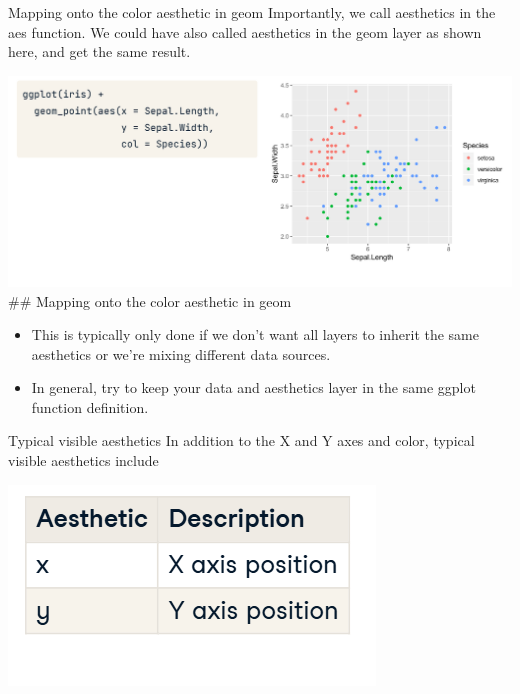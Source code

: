 \documentclass[
  ignorenonframetext,
]{beamer}
\begin{document}
\begin{frame}{Mapping onto the color aesthetic in geom}
\label{mapping-onto-the-color-aesthetic-in-geom}
Importantly, we call aesthetics in the aes function. We could have also
called aesthetics in the geom layer as shown here, and get the same
result.

\includegraphics{../images/im138.png} \#\# Mapping onto the color
aesthetic in geom

\begin{itemize}
\item
  This is typically only done if we don't want all layers to inherit the
  same aesthetics or we're mixing different data sources.
\item
  In general, try to keep your data and aesthetics layer in the same
  ggplot function definition.
\end{itemize}
\end{frame}

\begin{frame}{Typical visible aesthetics}
\label{typical-visible-aesthetics}
In addition to the X and Y axes and color, typical visible aesthetics
include

\includegraphics{../images/im139.png}
\end{frame}
\end{document}
